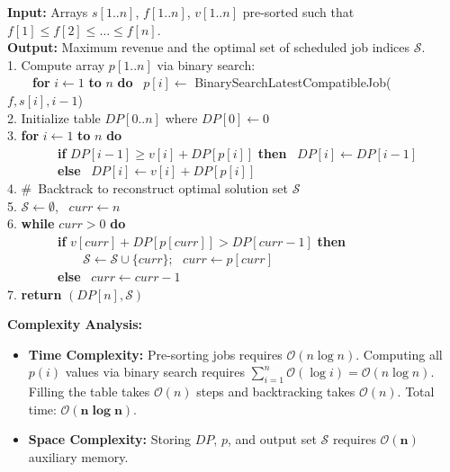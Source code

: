 \documentclass[11pt, a4paper]{article}
\newcommand{\Onotation}[1]{\mathcal{O}\left(#1\right)}
\newcommand{\kw}[1]{\textbf{\textcolor{primary}{#1}}}
\newcommand{\commentsymbol}{\textcolor{gray!80!black}{\#\ }}
\begin{document}
\begin{solutionbox}
  \begin{pseudocodebox}
    \kw{Input:} Arrays $s[1..n]$, $f[1..n]$, $v[1..n]$ pre-sorted such that $f[1] \le f[2] \le \dots \le f[n]$. \\
    \kw{Output:} Maximum revenue and the optimal set of scheduled job indices $\mathcal{S}$. \\[2pt]
    1. Compute array $p[1..n]$ via binary search: \\
    \ \ \ \ \kw{for} $i \leftarrow 1$ \kw{to} $n$ \kw{do} \ $p[i] \leftarrow$ BinarySearchLatestCompatibleJob($f, s[i], i-1$) \\[1pt]
    2. Initialize table $DP[0..n]$ where $DP[0] \leftarrow 0$ \\
    3. \kw{for} $i \leftarrow 1$ \kw{to} $n$ \kw{do} \\
    \ \ \ \ \ \ \ \ \kw{if} $DP[i-1] \ge v[i] + DP[p[i]]$ \kw{then} \ $DP[i] \leftarrow DP[i-1]$ \\
    \ \ \ \ \ \ \ \ \kw{else} \ $DP[i] \leftarrow v[i] + DP[p[i]]$ \\[1pt]
    4. \commentsymbol Backtrack to reconstruct optimal solution set $\mathcal{S}$ \\
    5. $\mathcal{S} \leftarrow \emptyset$, \ $curr \leftarrow n$ \\
    6. \kw{while} $curr > 0$ \kw{do} \\
    \ \ \ \ \ \ \ \ \kw{if} $v[curr] + DP[p[curr]] > DP[curr-1]$ \kw{then} \\
    \ \ \ \ \ \ \ \ \ \ \ \ $\mathcal{S} \leftarrow \mathcal{S} \cup \{curr\}$; \ $curr \leftarrow p[curr]$ \\
    \ \ \ \ \ \ \ \ \kw{else} \ $curr \leftarrow curr - 1$ \\[1pt]
    7. \kw{return} $(DP[n], \mathcal{S})$
  \end{pseudocodebox}

  \begin{complexitybox}
    \textbf{Complexity Analysis:}
    \begin{itemize}[leftmargin=1.4em, itemsep=0.5pt]
      \item \textbf{Time Complexity:} Pre-sorting jobs requires $\Onotation{n \log n}$. Computing all $p(i)$ values via binary search requires $\sum_{i=1}^n \Onotation{\log i} = \Onotation{n \log n}$. Filling the table takes $\Onotation{n}$ steps and backtracking takes $\Onotation{n}$. Total time: $\mathbf{\Onotation{n \log n}}$.
      \item \textbf{Space Complexity:} Storing $DP$, $p$, and output set $\mathcal{S}$ requires $\mathbf{\Onotation{n}}$ auxiliary memory.
    \end{itemize}
  \end{complexitybox}
\end{solutionbox}
\end{document}
